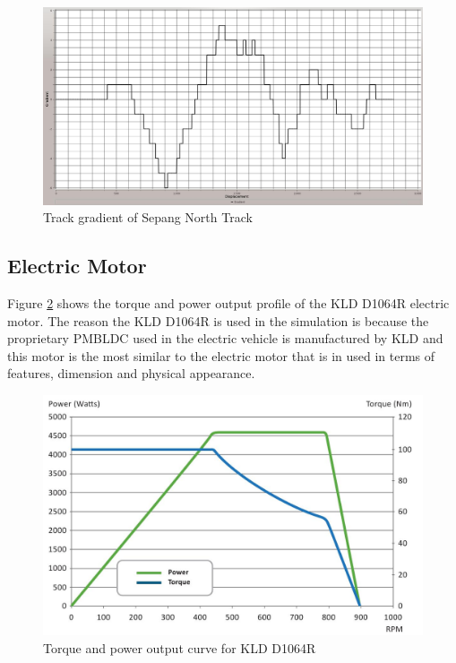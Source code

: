 \begin{figure} [htb]
	\centering
	\includegraphics[width=6in]{images/track_gradient.jpg}
	\caption{Track gradient of Sepang North Track}
	\label{im:trackGradient}
\end{figure}

\subsection{Electric Motor}
Figure \ref{im:motorTorqueCurve} shows the torque and power output profile of the KLD D1064R electric motor. The reason the KLD D1064R is used in the simulation is because the proprietary PMBLDC used in the electric vehicle is manufactured by KLD and this motor is the most similar to the electric motor that is in used in terms of features, dimension and physical appearance. 

\begin{figure} [htb]
	\centering
	\includegraphics[width=6in]{images/kld_motor_torque_curve.jpg}
	\caption{Torque and power output curve for KLD D1064R \citep{kld}}
	\label{im:motorTorqueCurve}
\end{figure}

